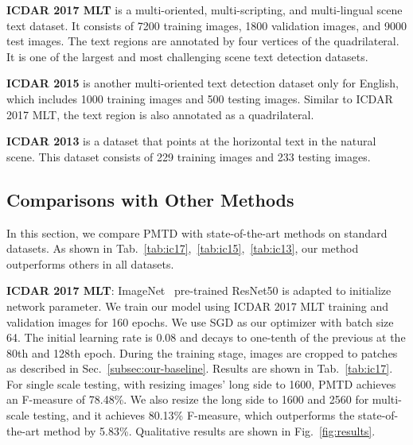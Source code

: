 \documentclass[10pt,twocolumn,letterpaper]{article}
\begin{document}
\textbf{ICDAR 2017 MLT} is a multi-oriented, multi-scripting, and multi-lingual scene text dataset. It consists of 7200 training images, 1800 validation images, and 9000 test images. The text regions are annotated by four vertices of the quadrilateral. It is one of the largest and most challenging scene text detection datasets.

\textbf{ICDAR 2015} is another multi-oriented text detection dataset only for English, which includes 1000 training images and 500 testing images. Similar to ICDAR 2017 MLT, the text region is also annotated as a quadrilateral.

\textbf{ICDAR 2013} is a dataset that points at the horizontal text in the natural scene. This dataset consists of 229 training images and 233 testing images.



\subsection{Comparisons with Other Methods}\label{subsec:comparisons-with-other-methods}

In this section, we compare PMTD with state-of-the-art methods on standard datasets. As shown in Tab.~\ref{tab:ic17},~\ref{tab:ic15},~\ref{tab:ic13}, our method outperforms others in all datasets.

\textbf{ICDAR 2017 MLT}: ImageNet~\cite{deng2009imagenet} pre-trained ResNet50 is adapted to initialize network parameter. We train our model using ICDAR 2017 MLT training and validation images for 160 epochs. We use SGD as our optimizer with batch size 64. The initial learning rate is 0.08 and decays to one-tenth of the previous at the 80th and 128th epoch. During the training stage, images are cropped to  patches as described in Sec.~\ref{subsec:our-baseline}. Results are shown in Tab.~\ref{tab:ic17}. For single scale testing, with resizing images' long side to 1600, PMTD achieves an F-measure of 78.48\%. We also resize the long side to 1600 and 2560 for multi-scale testing, and it achieves 80.13\% F-measure, which outperforms the state-of-the-art method by 5.83\%. Qualitative results are shown in Fig.~\ref{fig:results}.
\end{document}
